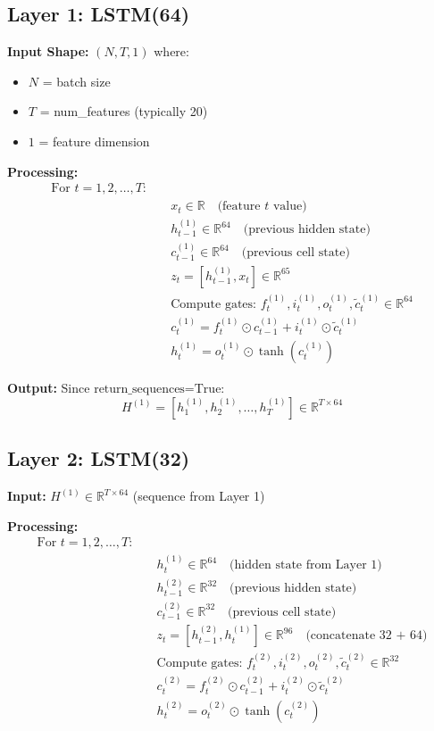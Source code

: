 \documentclass[12pt]{article}
\begin{document}
\subsection{Layer 1: LSTM(64)}

\textbf{Input Shape:} $(N, T, 1)$ where:
\begin{itemize}
    \item $N$ = batch size
    \item $T$ = num\_features (typically 20)
    \item $1$ = feature dimension
\end{itemize}

\textbf{Processing:}
\[
\begin{aligned}
\text{For } t = 1, 2, \ldots, T: \\
&\quad x_t \in \mathbb{R} \quad \text{(feature } t \text{ value)} \\
&\quad h_{t-1}^{(1)} \in \mathbb{R}^{64} \quad \text{(previous hidden state)} \\
&\quad c_{t-1}^{(1)} \in \mathbb{R}^{64} \quad \text{(previous cell state)} \\
&\quad z_t = [h_{t-1}^{(1)}, x_t] \in \mathbb{R}^{65} \\
&\quad \text{Compute gates: } f_t^{(1)}, i_t^{(1)}, o_t^{(1)}, \tilde{c}_t^{(1)} \in \mathbb{R}^{64} \\
&\quad c_t^{(1)} = f_t^{(1)} \odot c_{t-1}^{(1)} + i_t^{(1)} \odot \tilde{c}_t^{(1)} \\
&\quad h_t^{(1)} = o_t^{(1)} \odot \tanh(c_t^{(1)})
\end{aligned}
\]

\textbf{Output:} Since $\text{return\_sequences=True}$:
\[
H^{(1)} = [h_1^{(1)}, h_2^{(1)}, \ldots, h_T^{(1)}] \in \mathbb{R}^{T \times 64}
\]

\subsection{Layer 2: LSTM(32)}

\textbf{Input:} $H^{(1)} \in \mathbb{R}^{T \times 64}$ (sequence from Layer 1)

\textbf{Processing:}
\[
\begin{aligned}
\text{For } t = 1, 2, \ldots, T: \\
&\quad h_t^{(1)} \in \mathbb{R}^{64} \quad \text{(hidden state from Layer 1)} \\
&\quad h_{t-1}^{(2)} \in \mathbb{R}^{32} \quad \text{(previous hidden state)} \\
&\quad c_{t-1}^{(2)} \in \mathbb{R}^{32} \quad \text{(previous cell state)} \\
&\quad z_t = [h_{t-1}^{(2)}, h_t^{(1)}] \in \mathbb{R}^{96} \quad \text{(concatenate 32 + 64)} \\
&\quad \text{Compute gates: } f_t^{(2)}, i_t^{(2)}, o_t^{(2)}, \tilde{c}_t^{(2)} \in \mathbb{R}^{32} \\
&\quad c_t^{(2)} = f_t^{(2)} \odot c_{t-1}^{(2)} + i_t^{(2)} \odot \tilde{c}_t^{(2)} \\
&\quad h_t^{(2)} = o_t^{(2)} \odot \tanh(c_t^{(2)})
\end{aligned}
\]
\end{document}
